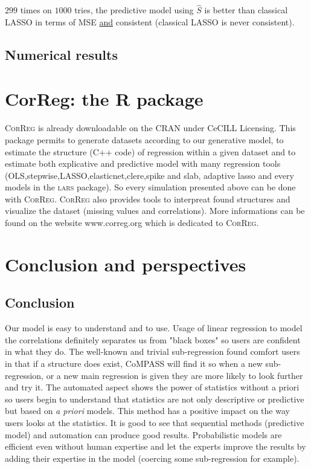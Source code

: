 \documentclass[11pt,a4paper]{report}
\begin{document}
		
		$299$ times on $1000$ tries, the predictive model using $\hat{S}$ is better than classical LASSO in terms of MSE \underline{and} consistent (classical LASSO is never consistent).
		

	\section{Numerical results}

\chapter{CorReg: the R package}	
	
		\textsc{CorReg} is already downloadable on the CRAN under CeCILL Licensing. This package permits to generate datasets according to our generative model, to estimate the structure (C++ code) of regression within a given dataset and to estimate both explicative and predictive model with many regression tools (OLS,stepwise,LASSO,elasticnet,clere,spike and slab, adaptive lasso and every models in the \textsc{lars} package). So every simulation presented above can be done with \textsc{CorReg}.
	\textsc{CorReg} also provides tools to interpreat found structures and visualize the dataset (missing values and correlations). More informations can be found on the website www.correg.org which is dedicated to \textsc{CorReg}.
	
\chapter{Conclusion and perspectives}
	\section{Conclusion}
		Our model is easy to understand and to use. Usage of linear regression to model the correlations definitely separates us from "black boxes" so users are confident in what they do. The well-known and trivial sub-regression found comfort users in that if a structure does exist, CoMPASS will find it so when a new sub-regression, or a new main regression is given they are more likely to look further and try it. The automated aspect shows the power of statistics without a priori so users begin to understand that statistics are not only descriptive or predictive but based on {\it a priori} models. This method has a positive impact on the way users looks at the statistics.
			It is good to see that sequential methods (predictive model) and automation can produce good results. Probabilistic models are efficient even without human expertise and let the experts improve the results by adding their expertise in the model (coercing some sub-regression for example).
		
\end{document}
